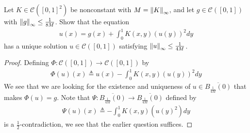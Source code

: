 \documentclass{report}
\begin{document}
\begin{question}{}{}
Let $K \in \mathcal{C}([0,1]^2)$ be nonconstant with $M= \left\| K \right\|_{\infty}$, and let $g \in \mathcal{C}([0,1])$ with $\left\| g \right\|_{\infty}\leq \frac{1}{8M}$. Show that the equation 
\begin{align*}
u(x)=g(x)+ \int_0^1 K(x,y)\left(u(y) \right)^2 dy 
\end{align*}
has a unique solution $u \in \mathcal{C}([0,1])$ satisfying $\left\| u \right\|_{\infty} \leq \frac{1}{4M}$. 
\end{question}
\begin{proof}
Defining $\Phi: \mathcal{C}([0,1]) \rightarrow \mathcal{C}([0,1]) $ by 
\begin{align*}
\Phi (u)(x)\triangleq u(x)- \int_0^1 K(x,y)\left(u(y) \right)^2 dy
\end{align*}
We see that we are looking for the existence and uniqueness of $u \in \overline{B_{\frac{1}{4M}}(0)}$ that makes $\Phi (u)=g$. Note that $\Psi : \overline{B_{\frac{1}{4M}}(0)}\rightarrow \overline{B_{\frac{1}{4M}}(0)}$  defined by 
\begin{align*}
\Psi (u)(x)\triangleq - \int_0^1 K(x,y)\left(u(y)^2 \right)dy 
\end{align*}
is a $\frac{1}{2}$-contradiction, we see that the earlier question suffices.


\end{proof}
\end{document}
